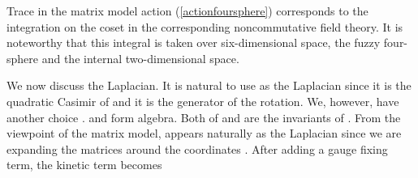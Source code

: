 \documentclass[a4paper,11pt]{article}
\begin{document}
Trace in the matrix model action (\ref{actionfoursphere}) 
corresponds to 
the integration on the coset in 
the corresponding noncommutative field theory.
It is noteworthy that this integral is taken over 
six-dimensional space, the fuzzy four-sphere and 
the internal two-dimensional space. 

We now discuss the Laplacian. 
It is natural to use \coordHE{} as 
the Laplacian since it is the quadratic Casimir of \coordHE{} 
and it is the generator of the rotation. 
We, however, have another choice \coordHE{}. 
\coordHE{} and \coordHE{} form \coordHE{} algebra. 
Both of \coordHE{} and \coordHE{} 
are the invariants of \coordHE{}. 
From the viewpoint of the matrix model, \coordHE{} 
appears naturally as the Laplacian since 
we are expanding the matrices around 
the coordinates \coordHE{}. 
After adding a gauge fixing term, the kinetic term becomes 
\end{document}
